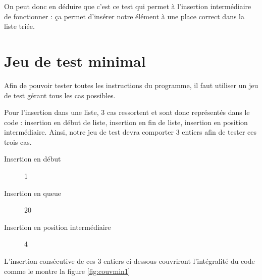 \documentclass[a4paper, 11pt]{article}
\begin{document}
	On peut donc en déduire que c'est ce test qui permet à l'insertion intermédiaire de fonctionner : ça permet d'insérer notre élément à une place
	correct dans la liste triée.
	\section{Jeu de test minimal}
	Afin de pouvoir tester toutes les instructions du
	programme, il faut utiliser un jeu de test gérant tous
	les cas possibles. 

	Pour l'insertion dans une liste, 3 cas ressortent et sont
	donc représentés dans le code : insertion en début de
	liste, insertion en fin de liste, insertion en position
	intermédiaire. Ainsi, notre jeu de test devra comporter 3
	entiers afin de tester ces trois cas.

	\begin{description}
		\item[Insertion en début] 1
		\item[Insertion en queue] 20
		\item[Insertion en position intermédiaire] 4
	\end{description}

	L'insertion consécutive de ces 3 entiers ci-dessous
	couvriront l'intégralité du code comme le montre la
	figure \ref{fig:couvmin1}
\end{document}
